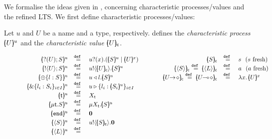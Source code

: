 \noi 
We formalise the ideas given in , concerning 
characteristic processes/values and the refined LTS.
We first define characteristic processes/values:

\begin{definition}
	\label{def:char}
	Let $u$ and $U$ be a name and a type, respectively.
	 defines the {\em characteristic process} 
	$[\!\!(U)\!\!]^{u}$ and the {\em characteristic value} $[\!\!(U)\!\!]_{\mathsf{c}}$.
\end{definition}

\begin{figure}
\[
	\begin{array}{rclcrcl}
		\mapchar{\btinp{U} S}{u}
		&\defeq&
		\binp{u}{x} (\mapchar{S}{u} \Par \mapchar{U}{x})
		&\qquad &
		\omapchar{S}  & \defeq &  s ~~ (s \textrm{ fresh})
		\\
		\mapchar{\btout{U} S}{u}
		&\defeq&
		\bout{u}{\omapchar{U}} \mapchar{S}{u}  
		&&
		\omapchar{\chtype{S}} \defeq \omapchar{\chtype{L}} &\defeq&a ~~ (a \textrm{ fresh})
		\\
		\mapchar{\btsel{l : S}}{u}
		& \defeq &
		\bsel{u}{l} \mapchar{S}{u}
		&&
		\omapchar{\shot{U}} \defeq \omapchar{\lhot{U}} & \defeq &  \abs{x}{\mapchar{U}{x}}
		\\
				\mapchar{\btbra{l_i: S_i}_{i \in I}}{u}
		& \defeq &
		\bbra{u}{l_i: \mapchar{S_i}{u}}_{i \in I}
		&&
		 
		&   &
		 
		\\
		\mapchar{\tvar{t}}{u}
		&\defeq&
		\varp{X}_{\vart{t}}
		& & 
		 
		& &
		 
		\\
		\mapchar{\trec{t}{S}}{u}
		&\defeq&
		\recp{X_{\vart{t}}}{\mapchar{S}{u}}
		&&
		 
		& &
		 
		\\
		\mapchar{\tinact}{u}
		& \defeq &
		\inact
		& & 
		  
		& &
		 
		\\
		\mapchar{\chtype{S}}{u} 
		&\defeq&
		\bout{u}{\omapchar{S}} \inact
		& & 	
					 
		&   &
		 
		\\
		\mapchar{\chtype{L}}{u}
		&\defeq&
		 

\end{array}\]
\end{figure}
